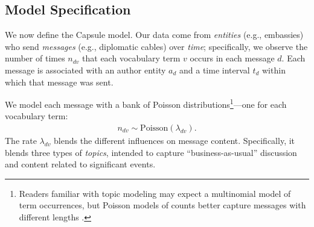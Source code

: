 

\subsection{Model Specification}
\label{sec:model_spec}

We now define the Capsule model. Our data come from \emph{entities}
(e.g., embassies) who send \emph{messages} (e.g., diplomatic cables)
over \emph{time}; specifically, we observe the number of times
$n_{dv}$ that each vocabulary term $v$ occurs in each message
$d$. Each message is associated with an author entity $a_d$ and a time
interval $t_d$ within which that message was sent.

We model each message with a bank of Poisson
distributions\footnote{Readers familiar with topic modeling may expect
  a multinomial model of term occurrences, but Poisson models of
  counts better capture messages with different lengths
  \cite{canny2004gap}.}---one for
each vocabulary term:
\begin{align}
  n_{dv} \sim \textrm{Poisson}\left(\lambda_{dv}\right).
\end{align}
The rate $\lambda_{dv}$ blends the different influences on message
content. Specifically, it blends three types of \emph{topics},
intended to capture ``business-as-usual'' discussion and content
related to significant events.

